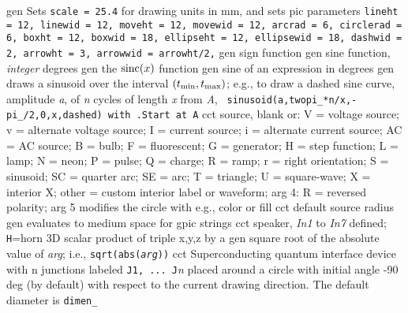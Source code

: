   {gen}
  {Sets {\tt scale = 25.4} for drawing units in mm, and sets
   pic parameters {\tt lineht = 12, linewid = 12, moveht = 12, movewid
   = 12,
    arcrad = 6, circlerad = 6, boxht = 12, boxwid = 18, ellipseht = 12,
    ellipsewid = 18, dashwid = 2, arrowht = 3, arrowwid = arrowht/2,}}
  {gen}
  {sign function}
  {gen}
  {sine function, {\sl integer\/} degrees}
  {gen}
  {the $\hbox{sinc}(x)$ function}
  {gen}
  {sine of an expression in degrees}
  {gen}
  {draws a sinusoid over the interval $(t_{\hbox{\scriptsize min}},
  t_{\hbox{\scriptsize max}})$;
   e.g., to draw a dashed sine curve, amplitude {\sl a},
   of {\sl n} cycles of length {\sl x} from {\sl A}, {\tt
   sinusoid(a,twopi\_*n/x,-pi\_/2,0,x,dashed) with .Start at A}}
\macrodef{source}{source}{(\linespec,
   V|v|I|i|AC|B|F|G|H|J|Q|L|N|P|S[C[r]]|E[r]]|T|X|U|{\sl other}, {\sl
   diameter},R)}
  {cct}
  {source, blank or:
                     V = voltage source; v = alternate voltage source; I =
                     current source; i = alternate current source; AC =
                     AC source; B = bulb; F = fluorescent; G = generator;
                     H = step function; L = lamp; N = neon; P = pulse;
                     Q = charge; R = ramp; r = right orientation; S =
                     sinusoid; SC = quarter arc; SE = arc; T = triangle;
                     U = square-wave; X = interior X; other = custom
                     interior label or waveform; arg 4: R = reversed
                     polarity; arg 5 modifies the circle with e.g.,
                     color or fill
   }
  {cct}
  {default source radius}
  {gen}
  {evaluates to medium space for gpic strings}
  {cct}
  {speaker, {\sl In1} to {\sl In7} defined; {\tt H}=horn
   }
  {3D} {scalar product of triple x,y,z by a}
  {gen}
  {square root of the absolute value of {\sl arg}; i.e.,
   {\tt sqrt(abs({\sl arg}))}}
  {cct}
  {Superconducting quantum interface device
   with {\sl }n junctions labeled {\tt J1, ... J}{\sl n} placed around
   a circle with initial angle -90 deg (by default) with respect to the
   current drawing direction. The default diameter is {\tt dimen\_} }
